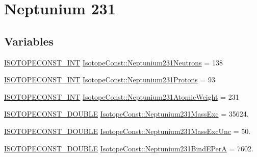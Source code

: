\hypertarget{group___isotope_const-_neptunium-_np231}{}\section{Neptunium 231}
\label{group___isotope_const-_neptunium-_np231}
\subsection*{Variables}
\begin{DoxyCompactItemize}
\item 
\mbox{\hyperlink{group___isotope_const-_macros_ga5f18360b3e99483a35c32d789e62621c}{I\+S\+O\+T\+O\+P\+E\+C\+O\+N\+S\+T\+\_\+\+I\+NT}} \mbox{\hyperlink{group___isotope_const-_neptunium-_np231_ga0d2e4b132ffa35c0a630c232aca39707}{Isotope\+Const\+::\+Neptunium231\+Neutrons}} = 138
\item 
\mbox{\hyperlink{group___isotope_const-_macros_ga5f18360b3e99483a35c32d789e62621c}{I\+S\+O\+T\+O\+P\+E\+C\+O\+N\+S\+T\+\_\+\+I\+NT}} \mbox{\hyperlink{group___isotope_const-_neptunium-_np231_ga97a2c32e3cea578337666447be80faf2}{Isotope\+Const\+::\+Neptunium231\+Protons}} = 93
\item 
\mbox{\hyperlink{group___isotope_const-_macros_ga5f18360b3e99483a35c32d789e62621c}{I\+S\+O\+T\+O\+P\+E\+C\+O\+N\+S\+T\+\_\+\+I\+NT}} \mbox{\hyperlink{group___isotope_const-_neptunium-_np231_gafabc6382bb56e729e382258650e540b3}{Isotope\+Const\+::\+Neptunium231\+Atomic\+Weight}} = 231
\item 
\mbox{\hyperlink{group___isotope_const-_macros_ga8f45a7272ce02c0b4c65c44636ed719a}{I\+S\+O\+T\+O\+P\+E\+C\+O\+N\+S\+T\+\_\+\+D\+O\+U\+B\+LE}} \mbox{\hyperlink{group___isotope_const-_neptunium-_np231_gaf36ef4c576e1abb0527815c001fbf4f7}{Isotope\+Const\+::\+Neptunium231\+Mass\+Exc}} = 35624.
\item 
\mbox{\hyperlink{group___isotope_const-_macros_ga8f45a7272ce02c0b4c65c44636ed719a}{I\+S\+O\+T\+O\+P\+E\+C\+O\+N\+S\+T\+\_\+\+D\+O\+U\+B\+LE}} \mbox{\hyperlink{group___isotope_const-_neptunium-_np231_gaadfc4107b5eab784dddd9cff1820a4fc}{Isotope\+Const\+::\+Neptunium231\+Mass\+Exc\+Unc}} = 50.
\item 
\mbox{\hyperlink{group___isotope_const-_macros_ga8f45a7272ce02c0b4c65c44636ed719a}{I\+S\+O\+T\+O\+P\+E\+C\+O\+N\+S\+T\+\_\+\+D\+O\+U\+B\+LE}} \mbox{\hyperlink{group___isotope_const-_neptunium-_np231_ga091988e76c589590aae80b564b6efd94}{Isotope\+Const\+::\+Neptunium231\+Bind\+E\+PerA}} = 7602.
\item 

\end{DoxyCompactItemize}
